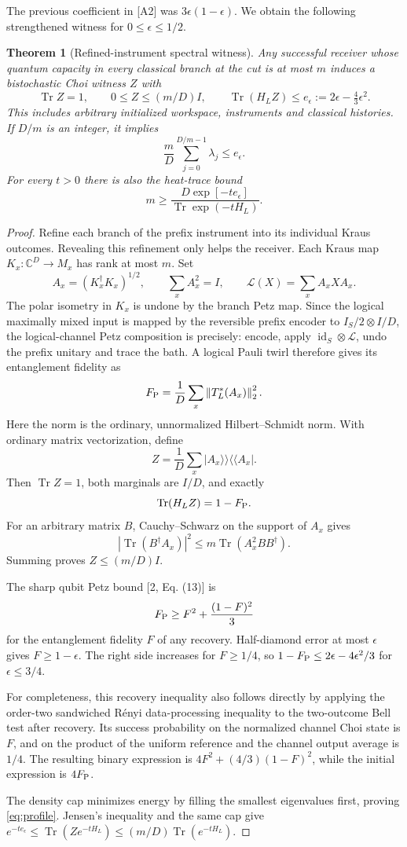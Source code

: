\documentclass[11pt,a4paper]{article}
\newtheorem{theorem}{Theorem}
\newcommand{\id}{\operatorname{id}}
\newcommand{\Tr}{\operatorname{Tr}}
\newcommand{\norm}[1]{\left\lVert#1\right\rVert}
\begin{document}
The previous coefficient in [A2] was $3\epsilon(1-\epsilon)$. We obtain the following strengthened witness for $0\le\epsilon\le1/2$.

\begin{theorem}[Refined-instrument spectral witness]
Any successful receiver whose quantum capacity in every classical branch at the cut is at most $m$ induces a bistochastic Choi witness $Z$ with
\[
 \Tr Z=1,\qquad 0\le Z\le(m/D)I,\qquad
 \Tr(H_LZ)\le e_\epsilon:=2\epsilon-\tfrac43\epsilon^2.
\]
This includes arbitrary initialized workspace, instruments and classical histories. If $D/m$ is an integer, it implies
\begin{equation}
 \frac{m}{D}\sum_{j=0}^{D/m-1}\lambda_j\le e_\epsilon.
 \label{eq:profile}
\end{equation}
For every $t>0$ there is also the heat-trace bound
\[
 m\ge\frac{D\exp[-t e_\epsilon]}{\Tr\exp(-tH_L)}.
\]
\end{theorem}

\begin{proof}
Refine each branch of the prefix instrument into its individual Kraus outcomes. Revealing this refinement only helps the receiver. Each Kraus map $K_x:\mathbb C^D\to M_x$ has rank at most $m$. Set
\[
 A_x=(K_x^\dagger K_x)^{1/2},\qquad
 \sum_xA_x^2=I,\qquad
 \mathcal L(X)=\sum_xA_xXA_x.
\]
The polar isometry in $K_x$ is undone by the branch Petz map. Since the logical maximally mixed input is mapped by the reversible prefix encoder to $I_S/2\otimes I/D$, the logical-channel Petz composition is precisely: encode, apply $\id_S\otimes\mathcal L$, undo the prefix unitary and trace the bath. A logical Pauli twirl therefore gives its entanglement fidelity as
\[
 F_{\rm P}=\frac1D\sum_x\norm{T_L^*(A_x)}_2^2.
\]
Here the norm is the ordinary, unnormalized Hilbert--Schmidt norm. With ordinary matrix vectorization, define
\[
 Z=\frac1D\sum_x|A_x\rangle\!\rangle\langle\!\langle A_x|.
\]
Then $\Tr Z=1$, both marginals are $I/D$, and exactly
\[
 \Tr(H_LZ)=1-F_{\rm P}.
\]
For an arbitrary matrix $B$, Cauchy--Schwarz on the support of $A_x$ gives
\[
 |\Tr(B^\dagger A_x)|^2\le m\Tr(A_x^2BB^\dagger).
\]
Summing proves $Z\le(m/D)I$.

The sharp qubit Petz bound [2, Eq. (13)] is
\[
 F_{\rm P}\ge F^2+\frac{(1-F)^2}{3}
\]
for the entanglement fidelity $F$ of any recovery. Half-diamond error at most $\epsilon$ gives $F\ge1-\epsilon$. The right side increases for $F\ge1/4$, so $1-F_{\rm P}\le2\epsilon-4\epsilon^2/3$ for $\epsilon\le3/4$.

For completeness, this recovery inequality also follows directly by applying the order-two sandwiched R\'enyi data-processing inequality to the two-outcome Bell test after recovery. Its success probability on the normalized channel Choi state is $F$, and on the product of the uniform reference and the channel output average is $1/4$. The resulting binary expression is $4F^2+(4/3)(1-F)^2$, while the initial expression is $4F_{\rm P}$.

The density cap minimizes energy by filling the smallest eigenvalues first, proving \eqref{eq:profile}. Jensen's inequality and the same cap give $e^{-t e_\epsilon}\le\Tr(Ze^{-tH_L})\le(m/D)\Tr(e^{-tH_L})$.
\end{proof}
\end{document}
